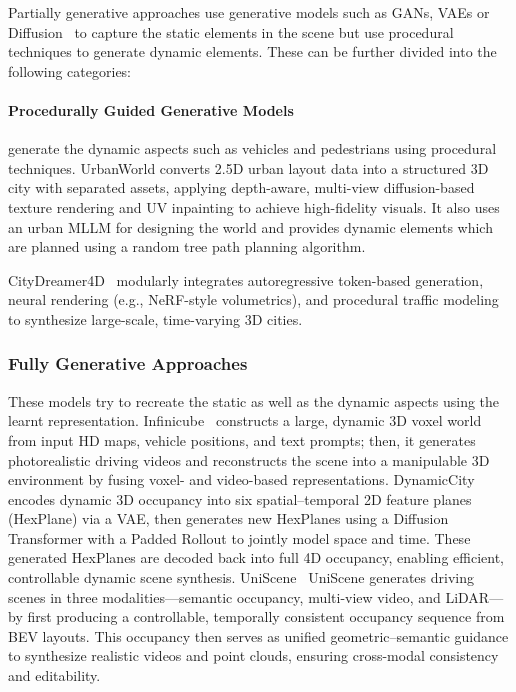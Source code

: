 \documentclass{article}
\begin{document}
Partially generative approaches use generative models such as GANs, VAEs or Diffusion~\cite{} to capture the static elements in the scene but use procedural techniques to generate dynamic elements. These can be further divided into the following categories:

\paragraph{Procedurally Guided Generative Models} generate the dynamic aspects such as vehicles and pedestrians using procedural techniques. UrbanWorld converts 2.5D urban layout data into a structured 3D city with separated assets, applying depth-aware, multi-view diffusion-based texture rendering and UV inpainting to achieve high-fidelity visuals. It also uses an urban MLLM for designing the world and provides dynamic elements which are planned using a random tree path planning algorithm.

CityDreamer4D~\cite{xie2024citydreamer} modularly integrates autoregressive token-based generation, neural rendering (e.g., NeRF-style volumetrics), and procedural traffic modeling to synthesize large-scale, time-varying 3D cities.

\subsubsection{Fully Generative Approaches}

These models try to recreate the static as well as the dynamic aspects using the learnt representation. Infinicube~\cite{lu2024infinicube} constructs a large, dynamic 3D voxel world from input HD maps, vehicle positions, and text prompts; then, it generates photorealistic driving videos and reconstructs the scene into a manipulable 3D environment by fusing voxel- and video-based representations. DynamicCity~\cite{bian2024dynamiccity} encodes dynamic 3D occupancy into six spatial–temporal 2D feature planes (HexPlane) via a VAE, then generates new HexPlanes using a Diffusion Transformer with a Padded Rollout to jointly model space and time. These generated HexPlanes are decoded back into full 4D occupancy, enabling efficient, controllable dynamic scene synthesis. UniScene~\cite{li2025uniscene} UniScene generates driving scenes in three modalities—semantic occupancy, multi-view video, and LiDAR—by first producing a controllable, temporally consistent occupancy sequence from BEV layouts. This occupancy then serves as unified geometric–semantic guidance to synthesize realistic videos and point clouds, ensuring cross-modal consistency and editability.
\end{document}
